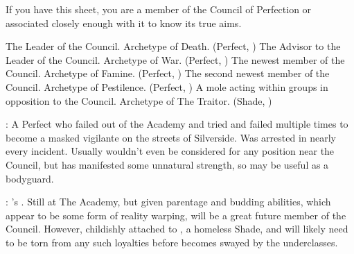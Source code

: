\documentclass[blue]{Silversiders}
\begin{document}
\name{\bCouncil{}}

If you have this sheet, you are a member of the Council of Perfection or associated closely enough with it to know its true aims.

\begin{members}
	\member{\cDeath{}} The Leader of the Council. Archetype of Death. (Perfect, \cDeath{\Sex})
	\member{\cWar{}} The Advisor to the Leader of the Council. Archetype of War. (Perfect, \cWar{\Sex})
	\member{\cFamine{}} The newest member of the Council. Archetype of Famine. (Perfect, \cFamine{\Sex})
	\member{\cPestilence{}} The second newest member of the Council. Archetype of Pestilence. (Perfect, \cPestilence{\Sex})
	\member{\cTraitor{}} A mole acting within groups in opposition to the Council. Archetype of The Traitor. (Shade, \cTraitor{\Sex})
	
\end{members}

\begin{itemz}
	\item \cMuscle{}: A \cMuscle{\sex} Perfect who failed out of the Academy and tried and failed multiple times to become a masked vigilante on the streets of Silverside. Was arrested in nearly every incident. Usually wouldn't even be considered for any position near the Council, but has manifested some unnatural strength, so \cMuscle{\they} may be useful as a bodyguard.
	\item \cTruth{}: \cDeath{}'s \cTruth{\offspring}. Still at The Academy, but given \cTruth{\their} parentage and budding abilities, which appear to be some form of reality warping, will be a great future member of the Council. However, \cTruth{\theyre} childishly attached to \cWisdom{}, a homeless Shade, and will likely need to be torn from any such loyalties before \cTruth{\they} becomes swayed by the underclasses.
					
\end{itemz}
\end{document}
